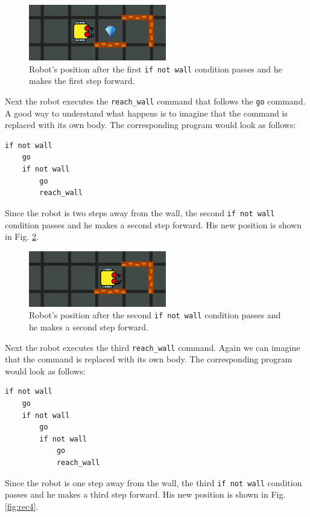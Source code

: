 {{{{\begin{figure}[!ht]
\begin{center}
\includegraphics[width=6cm]{imgk/rec-2.png}
\end{center}
\vspace{-4mm}
\caption{Robot's position after the first {\tt if not wall} condition passes and he makes the first step forward.}
\label{fig:rec2}
\vspace{-4mm}
\end{figure}
\noindent
Next the robot executes the {\tt reach\_wall} command that follows the {\tt go} command. A good way to 
understand what happens is to imagine that the command is replaced with its own body. The corresponding 
program would look as follows:

\begin{verbatim}
if not wall
    go
    if not wall
        go
        reach_wall
\end{verbatim}
\noindent
Since the robot is two steps away from the wall, the second {\tt if not wall} condition passes and 
he makes a second step forward. His new position is shown in Fig. \ref{fig:rec3}.

\begin{figure}[!ht]
\begin{center}
\includegraphics[width=6cm]{imgk/rec-3.png}
\end{center}
\vspace{-4mm}
\caption{Robot's position after the second {\tt if not wall} condition passes and he makes a second step forward.}
\label{fig:rec3}
\vspace{-4mm}
\end{figure}
\noindent
Next the robot executes the third {\tt reach\_wall} command. Again we can imagine that the command 
is replaced with its own body. The corresponding program would look as follows:

\begin{verbatim}
if not wall
    go
    if not wall
        go
        if not wall
            go
            reach_wall
\end{verbatim}
\noindent
Since the robot is one step away from the wall, the third {\tt if not wall} condition passes and 
he makes a third step forward. His new position is shown in Fig. \ref{fig:rec4}.

}}}}
